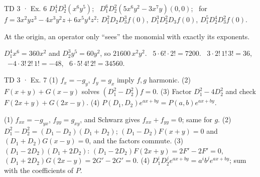 \begin{problem}{TD 3 · Ex. 6}
$D_1^4D_2^3(x^6y^5)$; \ $D_1^6D_2^2(5x^6y^2-3x^7y)(0,0)$; \ for
$f=3x^2yz^3-4x^3y^2z+6x^5y^4z^2$: $D_1^2D_2D_3^3f(0)$, $D_1^3D_2^2D_3f(0)$, $D_1^5D_2^4D_3^2f(0)$.
\end{problem}
\begin{hint}At the origin, an operator only ``sees'' the monomial with exactly its exponents.\end{hint}
\begin{solution}
$D_1^4x^6=360x^2$ and $D_2^3y^5=60y^2$, so $21600\,x^2y^2$. \ $5\cdot6!\cdot2!=7200$. \
$3\cdot2!\,1!\,3!=36$, \ $-4\cdot3!\,2!\,1!=-48$, \ $6\cdot5!\,4!\,2!=34560$.
\end{solution}

\begin{problem}{TD 3 · Ex. 7}
(1) $f_x=-g_y$, $f_y=g_x$ imply $f,g$ harmonic. (2) $F(x+y)+G(x-y)$ solves $(D_1^2-D_2^2)f=0$.
(3) Factor $D_1^2-4D_2^2$ and check $F(2x+y)+G(2x-y)$. (4) $P(D_1,D_2)e^{ax+by}=P(a,b)e^{ax+by}$.
\end{problem}
\begin{solution}
(1) $f_{xx}=-g_{yx}$, $f_{yy}=g_{xy}$, and Schwarz gives $f_{xx}+f_{yy}=0$; same for $g$.
(2) $D_1^2-D_2^2=(D_1-D_2)(D_1+D_2)$; $(D_1-D_2)F(x+y)=0$ and $(D_1+D_2)G(x-y)=0$, and the factors commute.
(3) $(D_1-2D_2)(D_1+2D_2)$: $(D_1-2D_2)F(2x+y)=2F'-2F'=0$, $(D_1+2D_2)G(2x-y)=2G'-2G'=0$.
(4) $D_1^iD_2^je^{ax+by}=a^ib^je^{ax+by}$; sum with the coefficients of $P$.
\end{solution}


